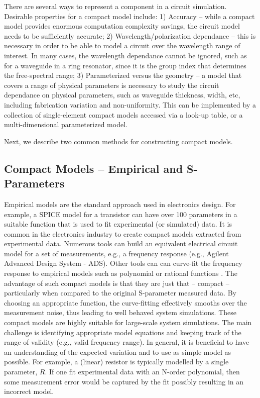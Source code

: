 \documentclass[journal]{spie}
\begin{document}
There are several ways to represent a component in a circuit simulation.  Desirable properties for a compact model include: 1) Accuracy -- while a compact model provides enormous computation complexity savings, the circuit model needs to be sufficiently accurate; 2) Wavelength/polarization dependance -- this is necessary in order to be able to model a circuit over the wavelength range of interest.  In many cases, the wavelength dependance cannot be ignored, such as for a waveguide in a ring resonator, since it is the group index that determines the free-spectral range; 3) Parameterized versus the geometry -- a model that covers a range of physical parameters is necessary to study the circuit dependance on physical parameters, such as waveguide thickness, width, etc, including fabrication variation and non-uniformity.  This can be implemented by a collection of single-element compact models accessed via a look-up table, or a multi-dimensional parameterized model.

	Next, we describe two common methods for constructing compact models.
	
\subsection{Compact Models -- Empirical and S-Parameters}
	
Empirical models are the standard approach used in electronics design.  For example, a SPICE model for a transistor can have over 100 parameters in a suitable function that is used to fit experimental (or simulated) data. It is common in the electronics industry to create compact models extracted from experimental data.  Numerous tools can build an equivalent electrical circuit model for a set of measurements, e.g., a frequency response (e.g., Agilent Advanced Design System - ADS).  Other tools can can curve-fit the frequency response to empirical models such as polynomial or rational functions \cite{gustavsen1999rational, zeng2006modified}.  The advantage of such compact models is that they are just that -- compact -- particularly when compared to the original S-parameter measured data.  By choosing an appropriate function, the curve-fitting effectively smooths over the measurement noise, thus leading to well behaved system simulations.  These compact models are  highly suitable for large-scale system simulations.  The main challenge is identifying appropriate model equations and keeping track of the range of validity (e.g., valid frequency range).    In general, it is beneficial to have an understanding of the expected variation and to use as simple model as possible.  For example, a (linear) resistor is typically modelled by a single parameter, $R$.  If one fit experimental data with an N-order polynomial, then some measurement error would be captured by the fit possibly resulting in an incorrect model.  
\end{document}
